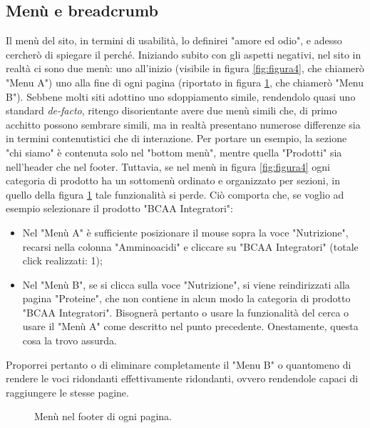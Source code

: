 \subsection{Menù e breadcrumb}
Il menù del sito, in termini di usabilità, lo definirei "amore ed odio", e adesso cercherò di spiegare il perché. 
Iniziando subito con gli aspetti negativi, nel sito in realtà ci sono due menù: uno all'inizio (visibile in figura \ref{fig:figura4}, che chiamerò "Menu A") uno alla fine di ogni pagina (riportato in figura \ref{fig:figura13}, che chiamerò "Menu B"). Sebbene molti siti adottino uno sdoppiamento simile, rendendolo quasi uno standard \textit{de-facto}, ritengo disorientante avere due menù simili che, di primo acchitto possono sembrare simili, ma in realtà presentano numerose differenze sia in termini contenutistici che di interazione. Per portare un esempio, la sezione "chi siamo" è contenuta solo nel "bottom menù", mentre quella "Prodotti" sia nell'header che nel footer. Tuttavia, se nel menù in figura \ref{fig:figura4} ogni categoria di prodotto ha un sottomenù ordinato e organizzato per sezioni, in quello della figura \ref{fig:figura13} tale funzionalità si perde. Ciò comporta che, se voglio ad esempio selezionare il prodotto "BCAA Integratori":
\begin{itemize}
	\item Nel "Menù A" è sufficiente posizionare il mouse sopra la voce "Nutrizione", recarsi nella colonna "Amminoacidi" e cliccare su "BCAA Integratori" (totale click realizzati: 1);
	\item Nel "Menù B", se si clicca sulla voce "Nutrizione", si viene reindirizzati alla pagina "Proteine", che non contiene in alcun modo la categoria di prodotto "BCAA Integratori". Bisognerà pertanto o usare la funzionalità del cerca o usare il "Menù A" come descritto nel punto precedente. Onestamente, questa cosa la trovo assurda.
\end{itemize}
Proporrei pertanto o di eliminare completamente il "Menu B" o quantomeno di rendere le voci ridondanti effettivamente ridondanti, ovvero rendendole capaci di raggiungere le stesse pagine.
\begin{figure}[!htb]
	\caption{\label{fig:figura13}} Menù nel footer di ogni pagina.
\end{figure}\\
